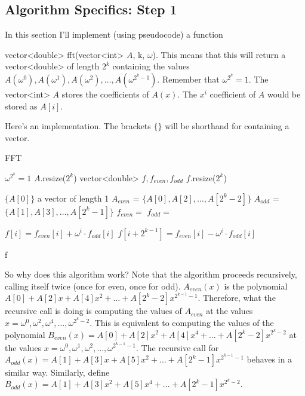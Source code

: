 \subsection{Algorithm Specifics: Step 1}

In this section I'll implement (using pseudocode) a function 

vector<double> fft(vector<int> $A$, k, $\omega$). This means that this will return a vector<double> of length $2^k$ containing the values $A(\omega^0), A(\omega^1), A(\omega^2), \dots, A(\omega^{2^k-1}).$ Remember that $\omega^{2^k} = 1.$ The vector<int> $A$ stores the coefficients of $A(x)$. The $x^i$ coefficient of $A$ would be stored as $A[i].$

Here's an implementation. The brackets $\{ \}$ will be shorthand for containing a vector.

\begin{algorithm}[H]
\caption{FFT}
\begin{algorithmic}
 \Comment $\omega^{2^k} = 1$
	\State $A$.resize($2^k$)
	\State vector<double> $f, f_{even}, f_{odd}$
	\State $f$.resize($2^k$)
	
		\State \Return $ \{A[0] \}$ \Comment a vector of length 1
    \EndIf
    \State $A_{even}$ = $ \{A[0], A[2], \dots, A[2^k-2] \}$
    \State $A_{odd}$ = $ \{A[1], A[3], \dots, A[2^k-1] \}$
    \State $f_{even} = $ 
    \State $f_{odd} = $ 
    
    	\State $f[i] = f_{even}[i] + \omega^i \cdot f_{odd}[i]$
	\State $f[i+2^{k-1}] = f_{even}[i] - \omega^i \cdot f_{odd}[i]$

	\EndFor

\Return f

\EndFunction

\end{algorithmic}
\end{algorithm}

So why does this algorithm work? Note that the algorithm proceeds recursively, calling itself twice (once for even, once for odd). $A_{even}(x)$ is the polynomial $A[0] + A[2]x + A[4]x^2 + \dots + A[2^k-2]x^{2^{k-1}-1}.$ Therefore, what the recursive call is doing is computing the values of $A_{even}$ at the values $x = \omega^0, \omega^2, \omega^4, \dots, \omega^{2^k-2}.$ This is equivalent to computing the values of the polynomial $B_{even}(x) = A[0] + A[2]x^2 + A[4]x^4 + \dots + A[2^k-2]x^{2^{k}-2}$ at the values $x = \omega^0, \omega^1, \omega^2, \dots, \omega^{2^{k-1}-1}.$ The recursive call for $A_{odd}(x) = A[1] + A[3]x + A[5]x^2 + \dots + A[2^k-1]x^{2^{k-1}-1}$ behaves in a similar way. Similarly, define $B_{odd}(x) = A[1] + A[3]x^2 + A[5]x^4 + \dots + A[2^k-1]x^{2^{k}-2}.$

